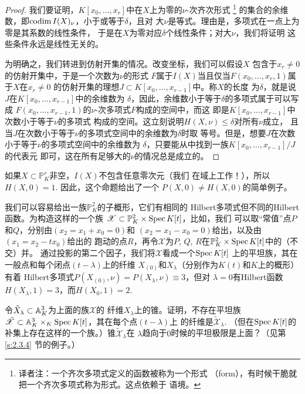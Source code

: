 \begin{proof}
我们要证明，$K[x_0,\dots,x_r]$中在$X$上为零的$\nu$-次齐次形式%
\footnote{译者注：一个齐次多项式定义的函数被称为一个形式
（form），有时候干脆就把一个齐次多项式称为形式。这点依赖于
语境。}%
的集合的余维数，即$\operatorname{codim} I(X)_\nu$，小于或等于$\delta$，且对
大$\nu$是等式。理由是，多项式在一点上为零是其系数的线性条件，
于是在$X$为零对应$\delta$个线性条件；对大$\nu$，我们将证明
这些条件永远是线性无关的。

为明确之，我们转进到仿射开集的情况。改变坐标，我们可以假设$X$
包含于$x_r\neq 0$的仿射开集中，于是一个次数为$\nu$的形式
$F$属于$I(X)$当且仅当$F(x_0,\dots,x_r,1)$属于$X$在$x_r\neq 0$
的仿射开集的理想$J\subset K[x_0,\dots,x_{r-1}]$中。称$X$的长度
为$\delta$，就是说$J$在$K[x_0,\dots,x_{r-1}]$中的余维数为
$\delta$，因此，余维数小于等于$\delta$的多项式属于可以写成
$F(x_0,\dots,x_{r-1},1)$的$\nu$-次多项式$F$构成的空间中，而这
即是$K[x_0,\dots,x_{r-1}]$中次数小于等于$\nu$的多项式
构成的空间。这立刻说明$H(X,\nu)\leq \delta$对所有$\nu$成立，
且当$J$在次数小于等于$\nu$的多项式空间中的余维数为$\delta$时取
等号。但是，想要$J$在次数小于等于$\nu$的多项式空间中的余维数为
$\delta$，只要能从中找到一族$K[x_0,\dots,x_{r-1}]/J$的代表元
即可，这在所有足够大的$\nu$的情况总是成立的。
\end{proof}

如果$X\subset \mathbb P_K^r$非空，$I(X)$不包含任意零次元（我们
在域上工作！），所以$H(X,0)=1$. 因此，这个命题给出了一个
$P(X,0)\neq H(X,0)$的简单例子。

我们可以容易给出一族$\mathbb P_K^2$的子概形，它们有相同的
Hilbert多项式但不同的Hilbert函数。为构造这样的一个族
$\mathscr X\subset \mathbb P_K^2\times \operatorname{Spec} K[t]$，比如，我们
可以取“常值”点$P$和$Q$，分别由$(x_2=x_1+x_0=0)$和
$(x_2=x_1-x_0=0)$给出，以及由$(x_1=x_2-tx_0)$给出的
跑动的点$R$，再令$\mathscr X$为$P$, $Q$, $R$在$\mathbb P_K^2
\times \operatorname{Spec} K[t]$中的（不交）并。
通过投影的第二个因子，我们将$\mathscr X$看成一个$\operatorname{Spec} K[t]$
上的平坦族，其在一般点和每个闭点$(t-\lambda)$上的纤维
$X_{(0)}$和$X_\lambda$（分别作为$K(t)$和$K$上的概形）有着
Hilbert多项式$P(X_{(0)},\nu)=P(X_\lambda,\nu)\equiv 3$，但对
$\lambda =0$有Hilbert函数$H(X_{\lambda},1)=3$，而$H(X_0,1)=2$.

\begin{exe}\label{exe:3.60}
令$\tilde{X}_{\lambda}\subset \mathbb{A}_K^3$为上面的族$\mathscr X$的
纤维$X_\lambda$上的锥。证明，不存在平坦族$\tilde{\mathscr X}
\subset \mathbb{A}_K^3\times_K \operatorname{Spec} K[t]$，其在每个点$(t-\lambda)$上
的纤维是$\tilde{\mathscr X}_\lambda$. （但在$\operatorname{Spec} K[t]$的
补集上存在这样的一个族。）锥$\tilde{\mathscr X}_\lambda$在
$\lambda$趋向于$0$时候的平坦极限是上面？（见第 \ref{s:2.3.4}
节的例子。）
\end{exe}

